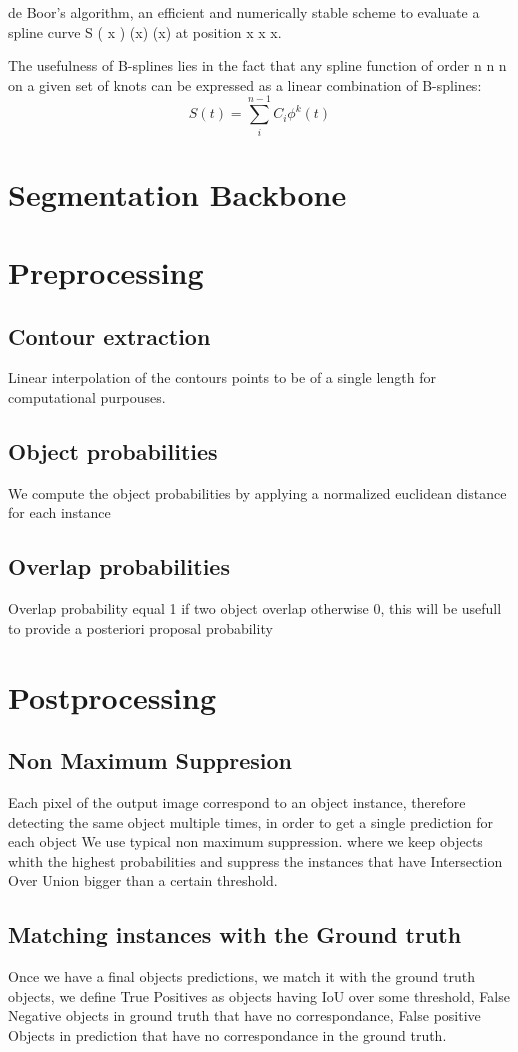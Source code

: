 \documentclass[main.tex]{subfiles}
\begin{document}
de Boor's algorithm, an efficient and numerically stable scheme to evaluate a spline curve S ( x ) {  (x)} { (x)} at position x { x} x.

The usefulness of B-splines lies in the fact that any spline function of order n { n} n on a given set of knots can be expressed as a linear combination of B-splines: 
\begin{equation}
    S(t) = \sum_{i}^{n-1}C_{i}\phi_{}^{k}(t)
\end{equation}
\section{Segmentation Backbone}
\section{Preprocessing}
\subsection{Contour extraction}
Linear interpolation of the contours points to be of a single length for computational purpouses.
\subsection{Object probabilities}
We compute the object probabilities by applying a normalized euclidean distance for each instance
\subsection{Overlap probabilities}
Overlap probability equal 1 if two object overlap otherwise 0, this will be usefull to provide a posteriori proposal probability
\section{Postprocessing}
\subsection{Non Maximum Suppresion}
Each pixel of the output image correspond to an object instance, therefore detecting the same object multiple times, in order to get a single prediction for each object We use typical non maximum suppression. where we keep objects whith the highest probabilities and suppress the instances that have Intersection Over Union bigger than a certain threshold.

\subsection{Matching instances with the Ground truth}
Once we have a final objects predictions, we match it with the ground truth objects, we define True Positives as objects having IoU over some threshold, False Negative objects in ground truth that have no correspondance, False positive Objects in prediction that have no correspondance in the ground truth.
\end{document}
